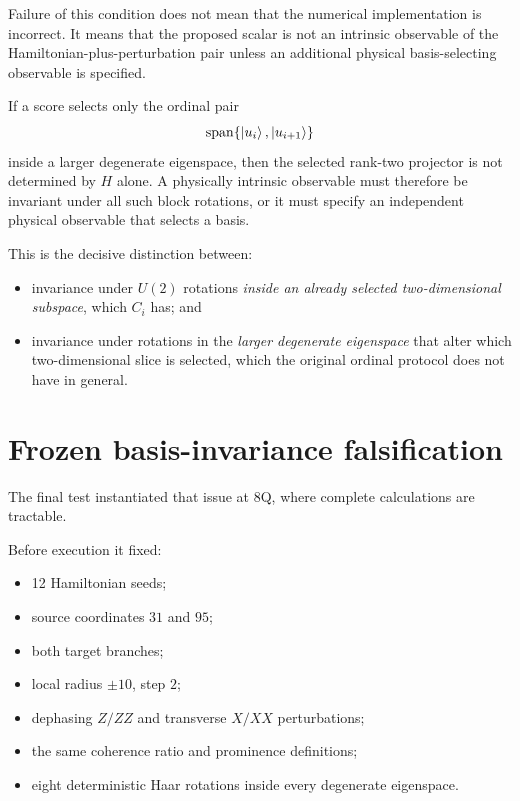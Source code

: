 \documentclass[11pt,a4paper]{article}
\newcommand{\Span}{\operatorname{span}}
\begin{document}
Failure of this condition does not mean that the numerical implementation is
incorrect.  It means that the proposed scalar is not an intrinsic observable
of the Hamiltonian-plus-perturbation pair unless an additional physical
basis-selecting observable is specified.

If a score selects only the ordinal pair
\[
\Span\{\ket{u_i},\ket{u_{i+1}}\}
\]
inside a larger degenerate eigenspace, then the selected rank-two projector is
not determined by \(H\) alone.  A physically intrinsic observable must
therefore be invariant under all such block rotations, or it must specify an
independent physical observable that selects a basis.

This is the decisive distinction between:

\begin{itemize}
\item invariance under \(U(2)\) rotations \emph{inside an already selected
      two-dimensional subspace}, which \(C_i\) has; and
\item invariance under rotations in the \emph{larger degenerate eigenspace}
      that alter which two-dimensional slice is selected, which the original
      ordinal protocol does not have in general.
\end{itemize}

\section{Frozen basis-invariance falsification}

The final test instantiated that issue at 8Q, where complete calculations are
tractable.

Before execution it fixed:

\begin{itemize}
\item 12 Hamiltonian seeds;
\item source coordinates \(31\) and \(95\);
\item both target branches;
\item local radius \(\pm10\), step \(2\);
\item dephasing \(Z/ZZ\) and transverse \(X/XX\) perturbations;
\item the same coherence ratio and prominence definitions;
\item eight deterministic Haar rotations inside every degenerate eigenspace.
\end{itemize}
\end{document}
